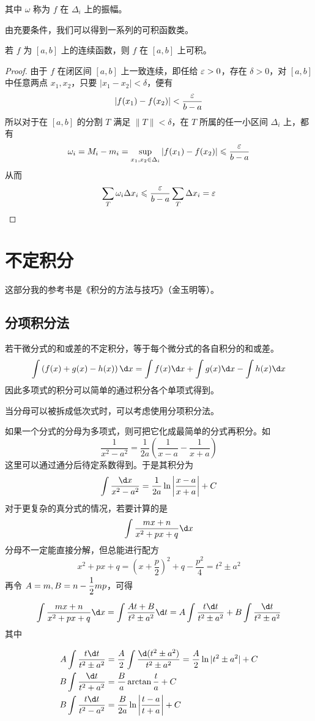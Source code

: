 其中 $\omega$ 称为 $f$ 在 $\Delta_i$ 上的振幅。

由充要条件，我们可以得到一系列的可积函数类。

\begin{theorem}
    若 $f$ 为 $[a,b]$ 上的连续函数，则 $f$ 在 $[a,b]$ 上可积。
\end{theorem}
\begin{proof}
    由于 $f$ 在闭区间 $[a,b]$ 上一致连续，即任给 $\varepsilon > 0$，存在 $\delta>0$，对 $[a,b]$ 中任意两点 $x_1,x_2$，只要 $|x_1-x_2|<\delta$，便有
    $$|f(x_1)-f(x_2)| < \frac{\varepsilon}{b-a}$$
    所以对于在 $[a,b]$ 的分割 $T$ 满足 $\|T\| < \delta$，在 $T$ 所属的任一小区间 $\Delta_i$ 上，都有
    $$\omega_i = M_i-m_i = \sup_{x_1,x_2\in\Delta_i}|f(x_1)-f(x_2)| \leqslant \frac{\varepsilon}{b-a}$$
    从而
    $$\sum_{T}\omega_i\Delta x_i \leqslant \frac{\varepsilon}{b-a}\sum_T\Delta x_i = \varepsilon$$
\end{proof}



\section{不定积分}

这部分我的参考书是《积分的方法与技巧》（金玉明等）。

\subsection{分项积分法}

若干微分式的和或差的不定积分，等于每个微分式的各自积分的和或差。
$$\int\left( f(x)+g(x)-h(x) \right)\d x = \int f(x)\d x + \int g(x)\d x - \int h(x)\d x$$
因此多项式的积分可以简单的通过积分各个单项式得到。

当分母可以被拆成低次式时，可以考虑使用分项积分法。

如果一个分式的分母为多项式，则可把它化成最简单的分式再积分。如
$$\frac{1}{x^2-a^2} = \frac{1}{2a}\left( \frac{1}{x-a}-\frac{1}{x+a} \right)$$
这里可以通过通分后待定系数得到。于是其积分为
$$\int \frac{\d x}{x^2-a^2} = \frac{1}{2a}\ln\left|\frac{x-a}{x+a}\right|+C$$
对于更复杂的真分式的情况，若要计算的是
$$\int \frac{mx+n}{x^2+px+q} \d x$$
分母不一定能直接分解，但总能进行配方
$$x^2+px+q = \left(x+\frac{p}{2}\right)^2+q-\frac{p^2}{4} = t^2 \pm a^2$$
再令 $A=m,B=n-\mfrac12mp$，可得
$$\int \frac{mx+n}{x^2+px+q} \d x = \int \frac{At+B}{t^2 \pm a^2} \d t 
= A\int \frac{t\d t}{t^2 \pm a^2} + B\int \frac{\d t}{t^2 \pm a^2}$$
其中

\begin{equation*}
    \begin{aligned}
        A\int \frac{t \d t}{t^2 \pm a^2} &= \frac{A}{2}\int \frac{\d(t^2 \pm a^2)}{t^2 \pm a^2} = \frac{A}{2} \ln|t^2 \pm a^2| +C \\
        B\int \frac{\d t}{t^2 + a^2} &= \frac{B}{a}\arctan\frac{t}{a}+C \\
        B\int \frac{t \d t}{t^2 - a^2} &= \frac{B}{2a}\ln\left|\frac{t-a}{t+a}\right|+C
    \end{aligned}
\end{equation*}


